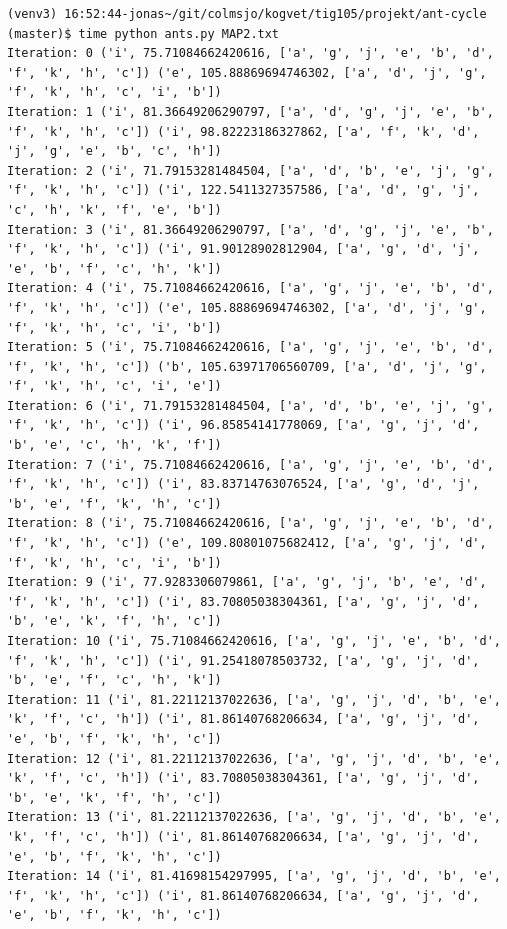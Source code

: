 \documentclass[11pt]{article}
\begin{document}
\begin{lstlisting}
(venv3) 16:52:44-jonas~/git/colmsjo/kogvet/tig105/projekt/ant-cycle (master)$ time python ants.py MAP2.txt
Iteration: 0 ('i', 75.71084662420616, ['a', 'g', 'j', 'e', 'b', 'd', 'f', 'k', 'h', 'c']) ('e', 105.88869694746302, ['a', 'd', 'j', 'g', 'f', 'k', 'h', 'c', 'i', 'b'])
Iteration: 1 ('i', 81.36649206290797, ['a', 'd', 'g', 'j', 'e', 'b', 'f', 'k', 'h', 'c']) ('i', 98.82223186327862, ['a', 'f', 'k', 'd', 'j', 'g', 'e', 'b', 'c', 'h'])
Iteration: 2 ('i', 71.79153281484504, ['a', 'd', 'b', 'e', 'j', 'g', 'f', 'k', 'h', 'c']) ('i', 122.5411327357586, ['a', 'd', 'g', 'j', 'c', 'h', 'k', 'f', 'e', 'b'])
Iteration: 3 ('i', 81.36649206290797, ['a', 'd', 'g', 'j', 'e', 'b', 'f', 'k', 'h', 'c']) ('i', 91.90128902812904, ['a', 'g', 'd', 'j', 'e', 'b', 'f', 'c', 'h', 'k'])
Iteration: 4 ('i', 75.71084662420616, ['a', 'g', 'j', 'e', 'b', 'd', 'f', 'k', 'h', 'c']) ('e', 105.88869694746302, ['a', 'd', 'j', 'g', 'f', 'k', 'h', 'c', 'i', 'b'])
Iteration: 5 ('i', 75.71084662420616, ['a', 'g', 'j', 'e', 'b', 'd', 'f', 'k', 'h', 'c']) ('b', 105.63971706560709, ['a', 'd', 'j', 'g', 'f', 'k', 'h', 'c', 'i', 'e'])
Iteration: 6 ('i', 71.79153281484504, ['a', 'd', 'b', 'e', 'j', 'g', 'f', 'k', 'h', 'c']) ('i', 96.85854141778069, ['a', 'g', 'j', 'd', 'b', 'e', 'c', 'h', 'k', 'f'])
Iteration: 7 ('i', 75.71084662420616, ['a', 'g', 'j', 'e', 'b', 'd', 'f', 'k', 'h', 'c']) ('i', 83.83714763076524, ['a', 'g', 'd', 'j', 'b', 'e', 'f', 'k', 'h', 'c'])
Iteration: 8 ('i', 75.71084662420616, ['a', 'g', 'j', 'e', 'b', 'd', 'f', 'k', 'h', 'c']) ('e', 109.80801075682412, ['a', 'g', 'j', 'd', 'f', 'k', 'h', 'c', 'i', 'b'])
Iteration: 9 ('i', 77.9283306079861, ['a', 'g', 'j', 'b', 'e', 'd', 'f', 'k', 'h', 'c']) ('i', 83.70805038304361, ['a', 'g', 'j', 'd', 'b', 'e', 'k', 'f', 'h', 'c'])
Iteration: 10 ('i', 75.71084662420616, ['a', 'g', 'j', 'e', 'b', 'd', 'f', 'k', 'h', 'c']) ('i', 91.25418078503732, ['a', 'g', 'j', 'd', 'b', 'e', 'f', 'c', 'h', 'k'])
Iteration: 11 ('i', 81.22112137022636, ['a', 'g', 'j', 'd', 'b', 'e', 'k', 'f', 'c', 'h']) ('i', 81.86140768206634, ['a', 'g', 'j', 'd', 'e', 'b', 'f', 'k', 'h', 'c'])
Iteration: 12 ('i', 81.22112137022636, ['a', 'g', 'j', 'd', 'b', 'e', 'k', 'f', 'c', 'h']) ('i', 83.70805038304361, ['a', 'g', 'j', 'd', 'b', 'e', 'k', 'f', 'h', 'c'])
Iteration: 13 ('i', 81.22112137022636, ['a', 'g', 'j', 'd', 'b', 'e', 'k', 'f', 'c', 'h']) ('i', 81.86140768206634, ['a', 'g', 'j', 'd', 'e', 'b', 'f', 'k', 'h', 'c'])
Iteration: 14 ('i', 81.41698154297995, ['a', 'g', 'j', 'd', 'b', 'e', 'f', 'k', 'h', 'c']) ('i', 81.86140768206634, ['a', 'g', 'j', 'd', 'e', 'b', 'f', 'k', 'h', 'c'])

\end{lstlisting}
\end{document}
